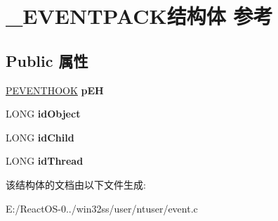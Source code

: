 \hypertarget{struct___e_v_e_n_t_p_a_c_k}{}\section{\+\_\+\+E\+V\+E\+N\+T\+P\+A\+C\+K结构体 参考}
\label{struct___e_v_e_n_t_p_a_c_k}
\subsection*{Public 属性}
\begin{DoxyCompactItemize}
\item 
\mbox{\label{struct___e_v_e_n_t_p_a_c_k_adea34b1041605c7eacde087d1cdd5e75}} 
\hyperlink{structtag_e_v_e_n_t_h_o_o_k}{P\+E\+V\+E\+N\+T\+H\+O\+OK} {\bfseries p\+EH}
\item 
\mbox{\label{struct___e_v_e_n_t_p_a_c_k_a3fa1c27af8005ff6fd40713385b7c0ae}} 
L\+O\+NG {\bfseries id\+Object}
\item 
\mbox{\label{struct___e_v_e_n_t_p_a_c_k_a8bd5f417814ae9d83055b1583e321252}} 
L\+O\+NG {\bfseries id\+Child}
\item 
\mbox{\label{struct___e_v_e_n_t_p_a_c_k_aeb8ef259b407d989b983b5708370cd68}} 
L\+O\+NG {\bfseries id\+Thread}
\end{DoxyCompactItemize}


该结构体的文档由以下文件生成\+:\begin{DoxyCompactItemize}
\item 
E\+:/\+React\+O\+S-\/0../win32ss/user/ntuser/event.\+c\end{DoxyCompactItemize}
